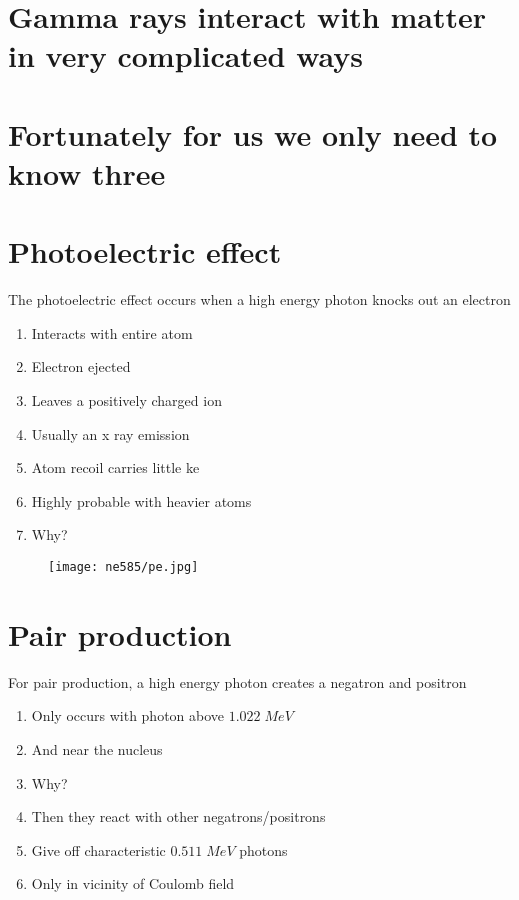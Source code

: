\documentclass[aspectratio=1610,pdftex,dvipsnames,compress,xcolor={dvipsnames}]{beamer}
\newcommand{\acf}{\acrfull} %
\begin{document}
\section{Gamma rays interact with matter in very complicated ways}
\section{Fortunately for us we only need to know three}
\section{Photoelectric effect}


\addtocounter{framenumber}{-3} 
\begin{frame}{The photoelectric effect occurs when a high energy photon knocks out an electron}
    \begin{enumerate}[series=outerlist,topsep=0pt,itemsep=21pt,leftmargin=*,label=(\arabic*)]
        \item[]Interacts with entire atom
        \item[]Electron ejected
        \item[]Leaves a positively charged ion
        \item[]Usually an x ray emission
        \item[]Atom recoil carries little \acf{ke}
        \item[]Highly probable with heavier atoms
        \item[]Why?
    \end{enumerate}
\end{frame}


\begin{frame}{}
    \begin{figure}
        \centering
        \texttt{[image: ne585/pe.jpg]}
    \end{figure}
\end{frame}


\section{Pair production}


\addtocounter{framenumber}{-1} 
\begin{frame}{For pair production, a high energy photon creates a negatron and positron}
    \begin{enumerate}[series=outerlist,topsep=0pt,itemsep=21pt,leftmargin=*,label=(\arabic*)]
        \item[]Only occurs with photon above $1.022 \; MeV$
        \item[]And near the nucleus
        \item[]Why?
        \item[]Then they react with other negatrons/positrons
        \item[]Give off characteristic $0.511 \; MeV$ photons
        \item[]Only in vicinity of Coulomb field
    \end{enumerate}
\end{frame}
\end{document}

